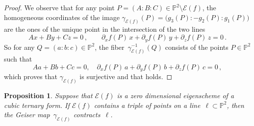 \documentclass[a4paper, 11pt, reqno]{amsart}
\theoremstyle{plain}
\newtheorem{prop}[lemma]{Proposition}
\theoremstyle{definition}
\newcommand{\p}{\mathbb{P}}
\newcommand{\Eig}[1]{\mathcal{E}\!\left( {#1} \right)}
\begin{document}
\begin{proof}
We observe that for any point $P=(A:B:C) \in \p^2 \setminus \Eig{f}$, the homogeneous coordinates
of the image $\gamma_{\Eig{f}}(P) = \bigl( g_3(P): -g_2(P): g_1(P) \bigr)$ are the ones of the unique point in the intersection of the two lines
%
\[
  Ax + By+ Cz = 0 \,, \qquad
  \partial_x f(P) \, x + \partial_y f(P) \, y + \partial_z f(P) \, z = 0 \,.
\]
%
So for any $Q = (a:b:c) \in \p^2$, the fiber~$\gamma_{\Eig{f}}^{-1}(Q)$ consists of the points $P \in \p^2$ such that
%
\begin{equation}
\label{eq:polars}
  Aa + Bb+ Cc = 0, \quad
  \partial_x f(P) \, a + \partial_y f(P) \, b + \partial_z f(P) \, c = 0 \,,
\end{equation}
%
which proves that $\gamma_{\Eig{f}}$ is surjective and that  holds.
\end{proof}

\begin{prop}
\label{prop:contract_aligned}
Suppose that $\Eig{f}$ is a zero dimensional eigenscheme of a cubic ternary form.
If $\Eig{f}$ contains a triple of points on a line~$\ell \subset \p^2$, then the Geiser map~$\gamma_{\Eig{f}}$ contracts~$\ell$.
\end{prop}
\end{document}
